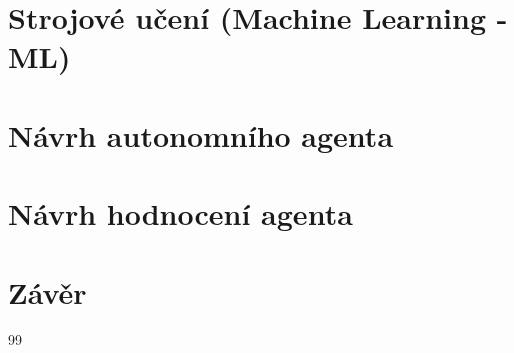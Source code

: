\documentclass[a4paper,twoside,12pt]{book}
\begin{document}


\chapter{Strojové učení (Machine Learning - ML)}



\chapter{Návrh autonomního agenta}



\chapter{Návrh hodnocení agenta}



\chapter*{Závěr} %




\clearpage  %

\begin{thebibliography}{99}   
	
	
	
\end{thebibliography}

\newpage %
\appendix %



%
%
\end{document}

